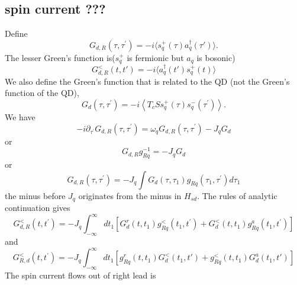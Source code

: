 \documentclass[11pt,a4paper]{article}
\begin{document}
\subsection{spin current ???}
Define
\begin{equation}
G_{d, R}\left(\tau, \tau^{\prime}\right)=-i\langle s_{q}^{+}(\tau) a_{q}^{\dag}(\tau')\rangle.
\end{equation}
The lesser Green's function is($s_{q}^{+}$ is fermionic but $a_{q}$ is bosonic)
\begin{equation}
G_{d, R}^{<}\left(t, t'\right)=-i\langle  a_{q}^{\dag}(t') s_{q}^{+}(t) \rangle
\end{equation}
We also define the Green’s function that is related to the QD (not the Green’s function of the QD),
\begin{equation}
G_{d}\left(\tau, \tau^{\prime}\right)= -i\left\langle T_{c} S s_{q}^{+}(\tau) s_{q}^{-}\left(\tau^{\prime}\right)\right\rangle .
\end{equation}
We have
\begin{equation}
-i \partial_{\tau^{\prime}} G_{d, R}\left(\tau, \tau^{\prime}\right)=\omega_{q} G_{d, R}\left(\tau, \tau^{\prime}\right)-J_{q} G_{d}
\end{equation}
or
\begin{equation}
G_{d, R} g_{R q}^{-1}=-J_{q} G_{d}
\end{equation}
or
\begin{equation}
G_{d, R}\left(\tau, \tau^{\prime}\right)=-J_{q} \int G_{d}\left(\tau, \tau_{1}\right) g_{R q}\left(\tau_{1}, \tau^{\prime}\right) d \tau_{1}
\end{equation}
the minus before $J_{q}$ originates from the minus in $H_{sd}$. The rules of analytic continuation gives
\begin{equation}
G_{d, R}^{<}\left(t, t^{\prime}\right)=-J_{q} \int_{-\infty}^{\infty}dt_{1} [G_{d}^{r}\left(t, t_{1}\right) g_{R q}^{<}\left(t_{1}, t^{\prime}\right) + G_{d}^{<}\left(t, t_{1}\right) g_{R q}^{a}\left(t_{1}, t^{\prime}\right)]
\end{equation}
and
\begin{equation}
G_{R,d}^{<}\left(t, t^{\prime}\right)=-J_{q} \int_{-\infty}^{\infty}dt_{1} [g_{R q}^{r}\left(t, t_{1}\right) G_{d}^{<}\left(t_{1}, t'\right)  + g_{R q}^{<}\left(t, t_{1}\right) G_{d}^{a}\left(t_{1}, t'\right)]
\end{equation}
The spin current flows out of right lead is
\end{document}
